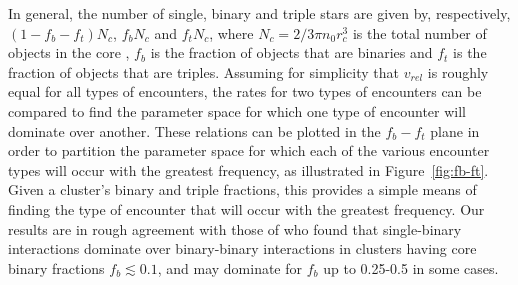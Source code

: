 \begin{enumerate}
In general, the number of single, binary and triple stars are 
given by, respectively, $(1-f_b-f_t)N_c$, $f_bN_c$ and $f_tN_c$,
where $N_c = 2/3{\pi}n_0r_c^3$ is the total number of objects in the
core \citep{leonard89}, $f_b$ is the
fraction of objects that are binaries and $f_t$ is the fraction of
objects that are triples.  Assuming for simplicity that 
$v_{rel}$ is roughly equal for all types of encounters, the rates for
two types of encounters can be compared to find the parameter space for
which one type of encounter will dominate over another.  These
relations can be plotted in 
the $f_b-f_t$ plane in order to partition the parameter space for
which each of the various encounter types will occur with the greatest
frequency, as illustrated in Figure~\ref{fig:fb-ft}.  Given a
cluster's binary and triple fractions, this provides a 
simple means of finding the type of encounter that will occur with the
greatest frequency.  Our results
are in rough agreement with those of \citet{sigurdsson93} who found
that single-binary interactions dominate over binary-binary
interactions in clusters having core binary fractions $f_b \lesssim
0.1$, and may dominate for $f_b$ up to 0.25-0.5 in some cases. 



\end{enumerate}

